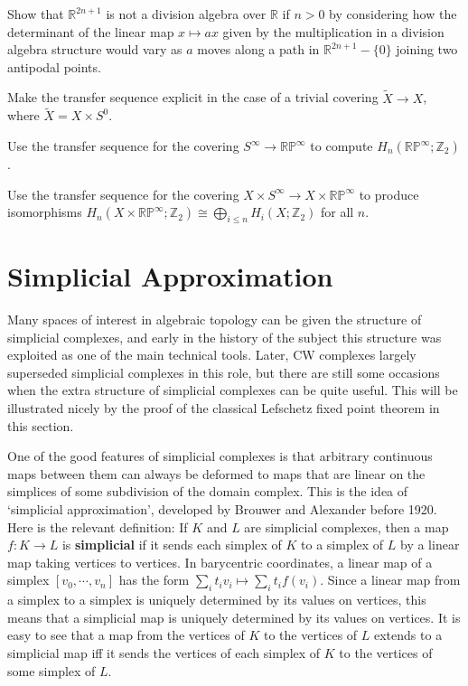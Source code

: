 \begin{exercise}
Show that $\mathbb{R}^{2n+1}$ is not a division algebra over $\mathbb{R}$ if $n > 0$ by considering how the determinant of the linear map $x \mapsto ax$ given by the multiplication in a division algebra structure would vary as $a$ moves along a path in $\mathbb{R}^{2n+1} - \{0\}$ joining two antipodal points.
\end{exercise}

\begin{exercise}
Make the transfer sequence explicit in the case of a trivial covering $\tilde{X} \to X$, where $\tilde{X} = X \times S^0$.
\end{exercise}

\begin{exercise}
Use the transfer sequence for the covering $S^\infty \to \mathbb{RP}^\infty$ to compute $H_n(\mathbb{RP}^\infty; \mathbb{Z}_2)$.
\end{exercise}

\begin{exercise}
Use the transfer sequence for the covering $X \times S^\infty \to X \times \mathbb{RP}^\infty$ to produce isomorphisms $H_n(X \times \mathbb{RP}^\infty; \mathbb{Z}_2) \cong \bigoplus_{i \leq n} H_i(X; \mathbb{Z}_2)$ for all $n$.
\end{exercise}

\section{Simplicial Approximation}

Many spaces of interest in algebraic topology can be given the structure of simplicial complexes, and early in the history of the subject this structure was exploited as one of the main technical tools. Later, CW complexes largely superseded simplicial complexes in this role, but there are still some occasions when the extra structure of simplicial complexes can be quite useful. This will be illustrated nicely by the proof of the classical Lefschetz fixed point theorem in this section.

One of the good features of simplicial complexes is that arbitrary continuous maps between them can always be deformed to maps that are linear on the simplices of some subdivision of the domain complex. This is the idea of `simplicial approximation', developed by Brouwer and Alexander before 1920. Here is the relevant definition: If $K$ and $L$ are simplicial complexes, then a map $f : K \to L$ is \textbf{simplicial} if it sends each simplex of $K$ to a simplex of $L$ by a linear map taking vertices to vertices. In barycentric coordinates, a linear map of a simplex $[v_0, \cdots, v_n]$ has the form $\sum_i t_i v_i \mapsto \sum_i t_i f(v_i)$. Since a linear map from a simplex to a simplex is uniquely determined by its values on vertices, this means that a simplicial map is uniquely determined by its values on vertices. It is easy to see that a map from the vertices of $K$ to the vertices of $L$ extends to a simplicial map iff it sends the vertices of each simplex of $K$ to the vertices of some simplex of $L$.

